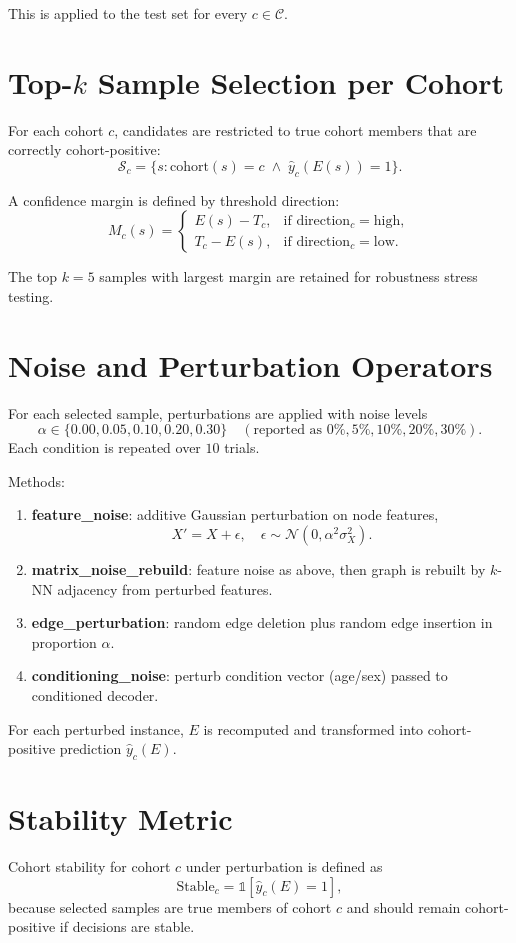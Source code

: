\documentclass[11pt]{article}
\begin{document}
This is applied to the test set for every $c\in\mathcal{C}$.

\section*{Top-$k$ Sample Selection per Cohort}
For each cohort $c$, candidates are restricted to true cohort members that are correctly cohort-positive:
\[
\mathcal{S}_c=\{s:\text{cohort}(s)=c\;\wedge\;\hat{y}_c(E(s))=1\}.
\]

A confidence margin is defined by threshold direction:
\begin{equation}
M_c(s)=
\begin{cases}
E(s)-T_c, & \text{if direction}_c=\text{high},\\
T_c-E(s), & \text{if direction}_c=\text{low}.
\end{cases}
\end{equation}

The top $k=5$ samples with largest margin are retained for robustness stress testing.

\section*{Noise and Perturbation Operators}
For each selected sample, perturbations are applied with noise levels
\[
\alpha\in\{0.00,0.05,0.10,0.20,0.30\}
\quad (\text{reported as }0\%,5\%,10\%,20\%,30\%).
\]
Each condition is repeated over $10$ trials.

Methods:
\begin{enumerate}
\item \textbf{feature\_noise}: additive Gaussian perturbation on node features,
\[
X' = X + \epsilon,\quad \epsilon\sim\mathcal{N}(0,\alpha^2\sigma_X^2).
\]
\item \textbf{matrix\_noise\_rebuild}: feature noise as above, then graph is rebuilt by $k$-NN adjacency from perturbed features.
\item \textbf{edge\_perturbation}: random edge deletion plus random edge insertion in proportion $\alpha$.
\item \textbf{conditioning\_noise}: perturb condition vector (age/sex) passed to conditioned decoder.
\end{enumerate}

For each perturbed instance, $E$ is recomputed and transformed into cohort-positive prediction $\hat{y}_c(E)$.

\section*{Stability Metric}
Cohort stability for cohort $c$ under perturbation is defined as
\begin{equation}
\mathrm{Stable}_c = \mathbb{1}[\hat{y}_c(E)=1],
\end{equation}
because selected samples are true members of cohort $c$ and should remain cohort-positive if decisions are stable.
\end{document}
